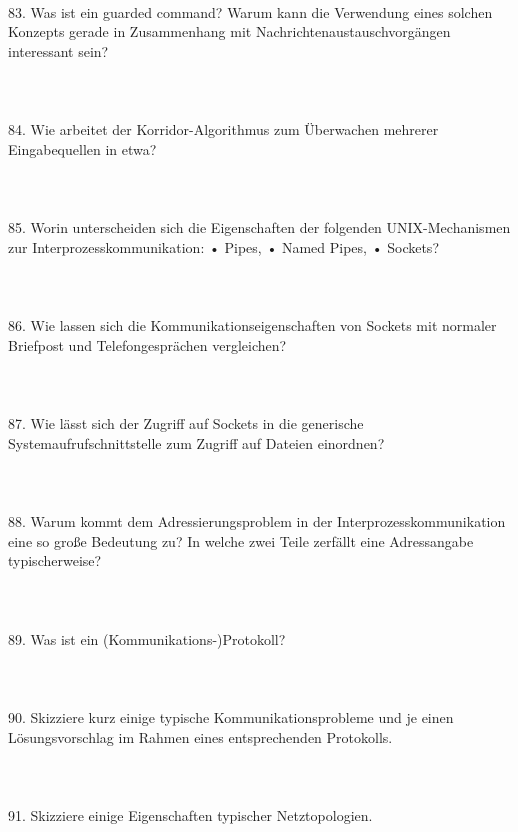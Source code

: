 \documentclass{article}
\begin{document}
\\
\\
\\
83. Was ist ein guarded command? Warum kann die Verwendung eines solchen Konzepts gerade
in Zusammenhang mit Nachrichtenaustauschvorgängen interessant sein?
\\
\\
\\
\\
84. Wie arbeitet der Korridor-Algorithmus zum Überwachen mehrerer Eingabequellen in etwa?
\\
\\
\\
\\
85. Worin unterscheiden sich die Eigenschaften der folgenden UNIX-Mechanismen zur Interprozesskommunikation:
• Pipes,
• Named Pipes,
• Sockets?
\\
\\
\\
\\
86. Wie lassen sich die Kommunikationseigenschaften von Sockets mit normaler Briefpost und
Telefongesprächen vergleichen?
\\
\\
\\
\\
87. Wie lässt sich der Zugriff auf Sockets in die generische Systemaufrufschnittstelle zum Zugriff
auf Dateien einordnen?
\\
\\
\\
\\
88. Warum kommt dem Adressierungsproblem in der Interprozesskommunikation eine so große
Bedeutung zu? In welche zwei Teile zerfällt eine Adressangabe typischerweise?
\\
\\
\\
\\
89. Was ist ein (Kommunikations-)Protokoll?
\\
\\
\\
\\
90. Skizziere kurz einige typische Kommunikationsprobleme und je einen Lösungsvorschlag im
Rahmen eines entsprechenden Protokolls.
\\
\\
\\
\\
91. Skizziere einige Eigenschaften typischer Netztopologien.
\\
\\
\end{document}
